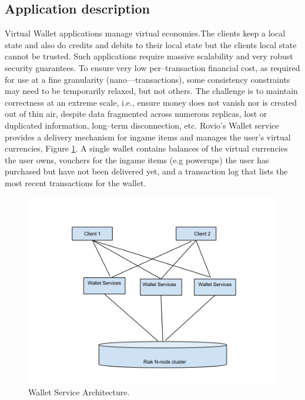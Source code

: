 \documentclass[11pt,a4paper]{report}
\begin{document}
\subsection{Application description}
Virtual Wallet applications manage virtual economies.The clients keep a local state and also do credits and debits to their local state but the clients local state cannot be trusted.  Such applications require massive scalability and very robust security guarantees. To ensure very low per--transaction financial cost, as required for use at a ﬁne granularity (nano---transactions), some consistency constraints may need to be temporarily relaxed, but not others. The challenge is to maintain correctness at an extreme scale, i.e., ensure money does not vanish nor is created out of thin air, despite data fragmented across numerous replicas, lost or duplicated information, long­--term disconnection, etc.
Rovio's Wallet service provides a delivery mechanism for in­game items and manages the user's virtual currencies, Figure \ref{fig:walled_services}. A single wallet contains balances of the virtual currencies the user owns, vouchers for the in­game items (e.g power­ups) the user has purchased but have not been delivered yet, and a transaction log that lists the most recent transactions for the wallet.
\begin{figure}[!h]
	\centering
	\includegraphics[width=1\textwidth]{./img/Wallet_service_architecture.png}

	\caption{Wallet Service Architecture.}
	\label{fig:walled_services}
\end{figure}
\end{document}
